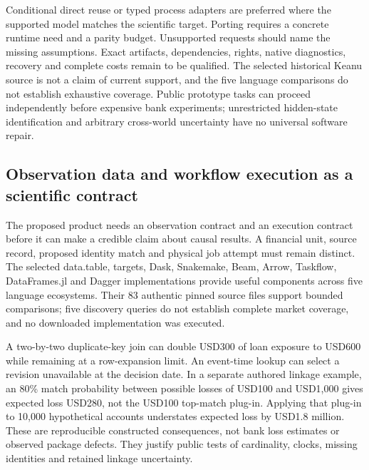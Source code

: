 Conditional direct reuse or typed process adapters are preferred where
the supported model matches the scientific target. Porting requires a
concrete runtime need and a parity budget. Unsupported requests should
name the missing assumptions. Exact artifacts, dependencies, rights,
native diagnostics, recovery and complete costs remain to be qualified.
The selected historical Keanu source is not a claim of current support,
and the five language comparisons do not establish exhaustive coverage.
Public prototype tasks can proceed independently before expensive bank
experiments; unrestricted hidden-state identification and arbitrary
cross-world uncertainty have no universal software repair.
\citep{exec25_bsw_choice}

\hypertarget{observation-data-and-workflow-execution-as-a-scientific-contract}{%
\subsection{Observation data and workflow execution as a scientific
contract}\label{observation-data-and-workflow-execution-as-a-scientific-contract}}

The proposed product needs an observation contract and an execution
contract before it can make a credible claim about causal results. A
financial unit, source record, proposed identity match and physical job
attempt must remain distinct. The selected data.table, targets, Dask,
Snakemake, Beam, Arrow, Taskflow, DataFrames.jl and Dagger
implementations provide useful components across five language
ecosystems. Their 83 authentic pinned source files support bounded
comparisons; five discovery queries do not establish complete market
coverage, and no downloaded implementation was executed.
\citep{exec25_dww_datatable,exec25_dww_targets,exec25_dww_dask,exec25_dww_snakemake,exec25_dww_beam,exec25_dww_arrow,exec25_dww_taskflow,exec25_dww_dataframes,exec25_dww_dagger,exec25_dww_choice}

A two-by-two duplicate-key join can double USD300 of loan exposure to
USD600 while remaining at a row-expansion limit. An event-time lookup
can select a revision unavailable at the decision date. In a separate
authored linkage example, an 80\% match probability between possible
losses of USD100 and USD1,000 gives expected loss USD280, not the USD100
top-match plug-in. Applying that plug-in to 10,000 hypothetical accounts
understates expected loss by USD1.8 million. These are reproducible
constructed consequences, not bank loss estimates or observed package
defects. They justify public tests of cardinality, clocks, missing
identities and retained linkage uncertainty. \citep{exec25_dww_choice}

